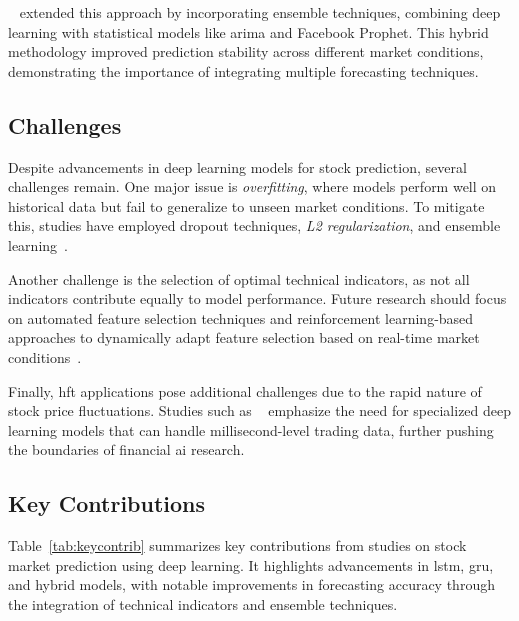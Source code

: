 ~\parencite{chang2024StockPrediction} extended this approach by 
incorporating ensemble techniques, combining deep learning with statistical models like 
\acrshort{arima} and Facebook Prophet. This hybrid methodology improved prediction stability across
different market conditions, demonstrating the importance of integrating multiple forecasting 
techniques.

\subsection{Challenges}

Despite advancements in deep learning models for stock prediction, several challenges remain. One major
issue is \emph{overfitting}, where models perform well on historical data but fail to generalize 
to unseen market conditions. To mitigate this, studies have employed dropout techniques, 
\emph{L2 regularization}, and ensemble learning~\parencite{shaban2024SMPDL}.

Another challenge is the selection of optimal technical indicators, as not all indicators contribute 
equally to model performance. Future research should focus on automated feature selection techniques
and reinforcement learning-based approaches to dynamically adapt feature selection based on
real-time market conditions~\parencite{balasubramanian2023SystematicSurvey}.

Finally, \acrfull{hft} applications pose additional challenges due to the rapid nature
of stock price fluctuations. Studies such as \citeauthor{guo2024LSTMStock}~\parencite{guo2024LSTMStock}
emphasize the need for specialized deep learning models that can handle millisecond-level trading 
data, further pushing the boundaries of financial \acrfull{ai} research.

\subsection{Key Contributions}

Table~\ref{tab:keycontrib} summarizes key contributions from studies on stock market prediction using deep learning. It highlights advancements in \acrshort{lstm}, \acrshort{gru}, and hybrid models, with notable improvements in forecasting accuracy through the integration of technical indicators and ensemble techniques.

